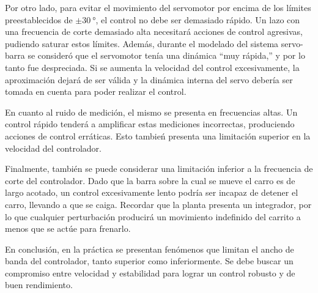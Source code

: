 Por otro lado, para evitar el movimiento del servomotor por encima de los límites preestablecidos de $\pm \qty{30}{\degree}$, el control no debe ser demasiado rápido. Un lazo con una frecuencia de corte demasiado alta necesitará acciones de control agresivas, pudiendo saturar estos límites. Además, durante el modelado del sistema servo-barra se consideró que el servomotor tenía una dinámica ``muy rápida,'' y por lo tanto fue despreciada. Si se aumenta la velocidad del control excesivamente, la aproximación dejará de ser válida y la dinámica interna del servo debería ser tomada en cuenta para poder realizar el control.

En cuanto al ruido de medición, el mismo se presenta en frecuencias altas. Un control rápido tenderá a amplificar estas mediciones incorrectas, produciendo acciones de control erráticas. Esto tambień presenta una limitación superior en la velocidad del controlador.

Finalmente, también se puede considerar una limitación inferior a la frecuencia de corte del controlador. Dado que la barra sobre la cual se mueve el carro es de largo acotado, un control excesivamente lento podría ser incapaz de detener el carro, llevando a que se caiga. Recordar que la planta presenta un integrador, por lo que cualquier perturbación producirá un movimiento indefinido del carrito a menos que se actúe para frenarlo.

En conclusión, en la práctica se presentan fenómenos que limitan el ancho de banda del controlador, tanto superior como inferiormente. Se debe buscar un compromiso entre velocidad y estabilidad para lograr un control robusto y de buen rendimiento.


